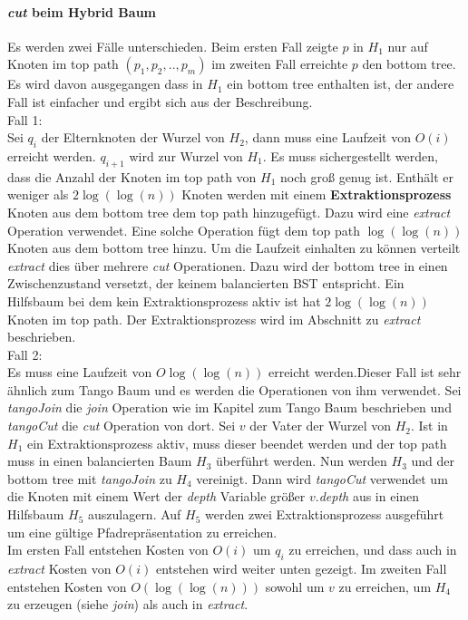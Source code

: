 \documentclass[a4paper,12pt]{article}
\begin{document}
\paragraph{\textit{cut} beim Hybrid Baum}
Es werden zwei Fälle unterschieden. Beim ersten Fall zeigte $p$ in $H_1$ nur auf Knoten im top path $\left(p_1,p_2,..,p_m\right)$ im zweiten Fall erreichte $p$ den bottom tree. Es wird davon ausgegangen dass in $H_1$ ein bottom tree enthalten ist, der andere Fall ist einfacher und ergibt sich aus der Beschreibung.\\
Fall 1:\\
Sei $q_i$ der Elternknoten der Wurzel von $H_2$, dann muss eine Laufzeit von $O\left(i\right)$ erreicht werden.  $q_{i+1}$ wird zur Wurzel von $H_1$. Es muss sichergestellt werden, dass die Anzahl der Knoten im top path von $H_1$ noch groß genug ist. Enthält er weniger als $2 \log\left(\log\left(n\right)\right)$ Knoten werden mit einem \textbf{Extraktionsprozess} Knoten aus dem bottom tree dem top path hinzugefügt. Dazu wird eine \textit{extract} Operation verwendet. Eine solche Operation fügt dem top path $\log\left(\log\left(n\right)\right)$ Knoten aus dem bottom tree hinzu. Um die Laufzeit einhalten zu können verteilt {\textit{extract}} dies über mehrere \textit{cut} Operationen. Dazu wird der bottom tree in einen Zwischenzustand versetzt, der keinem balancierten BST entspricht. Ein Hilfsbaum bei dem kein Extraktionsprozess aktiv ist hat  $2 \log\left(\log\left(n\right)\right)$ Knoten im top path. Der Extraktionsprozess wird im Abschnitt zu \textit{extract} beschrieben.  \\
Fall 2:\\
Es muss eine Laufzeit von $O\log\left(\log\left(n\right)\right)$ erreicht werden.Dieser Fall ist sehr ähnlich zum Tango Baum und es werden die Operationen von ihm verwendet. Sei \textit{tangoJoin} die \textit{join} Operation wie im Kapitel zum Tango Baum beschrieben und \textit{tangoCut} die \textit{cut} Operation von dort. Sei $v$ der Vater der Wurzel von $H_2$. Ist in $H_1$ ein Extraktionsprozess aktiv, muss dieser beendet werden und der top path muss in einen balancierten Baum $H_3$ überführt werden. Nun werden $H_3$ und der bottom tree mit \textit{tangoJoin}  zu $H_4$ vereinigt. Dann wird \textit{tangoCut} verwendet um die Knoten mit einem Wert der \textit{depth} Variable größer $v.$\textit{depth} aus in einen Hilfsbaum $H_5$ auszulagern. Auf $H_5$ werden zwei Extraktionsprozess ausgeführt um eine gültige Pfadrepräsentation zu erreichen.  \\
Im ersten Fall entstehen Kosten von $O\left(i\right)$ um $q_i$ zu erreichen, und dass auch in \textit{extract} Kosten von $O\left(i\right)$ entstehen wird weiter unten gezeigt. Im zweiten Fall entstehen Kosten von $O\left(\log\left(\log\left(n\right)\right)\right)$ sowohl um $v$ zu erreichen, um $H_4$ zu erzeugen (siehe \textit{join}) als auch in \textit{extract}.
\end{document}
